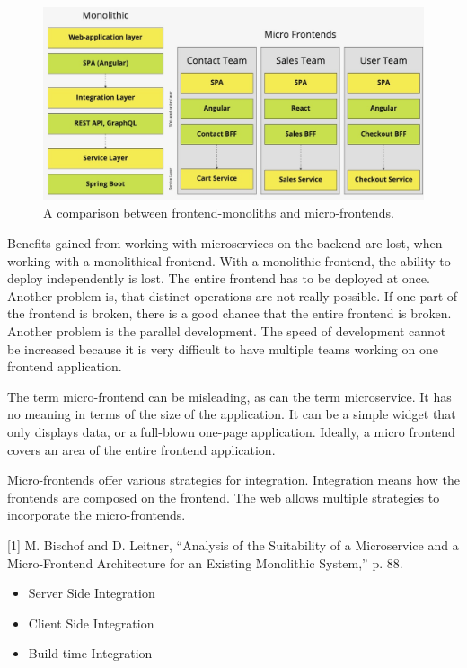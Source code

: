 \ifshowImages
\begin{figure}[H]
\centering
\includegraphics[width=0.8\linewidth]{images/ui-monolith-micro-frontends.jpeg}
\caption{A comparison between frontend-monoliths and micro-frontends.}\label{figure:state-of-the-art:ui-monolith-micro-frontend}
\end{figure}
\fi


Benefits gained from working with microservices on the backend are lost, when working with a monolithical frontend. With a monolithic frontend, the ability to deploy independently is lost. The entire frontend has to be deployed at once. Another problem is, that distinct operations are not really possible. If one part of the frontend is broken, there is a good chance that the entire frontend is broken. Another problem is the parallel development. The speed of development cannot be increased because it is very difficult to have multiple teams working on one frontend application. \cite{misc:2019:leitner:micro-frontends}

The term micro-frontend can be misleading, as can the term microservice. It has no meaning in terms of the size of the application. It can be a simple widget that only displays data, or a full-blown one-page application. Ideally, a micro frontend covers an area of the entire frontend application.

\ifshowUnusedContent
Micro-frontends offer various strategies for integration. Integration means how the frontends are composed on the frontend. The web allows multiple strategies to incorporate the micro-frontends. 

[1] M. Bischof and D. Leitner, “Analysis of the Suitability of a Microservice and a Micro-Frontend Architecture for an Existing Monolithic System,” p. 88.

\begin{itemize}
    \item Server Side Integration 
    \item Client Side Integration
    \item Build time Integration
\end{itemize}

